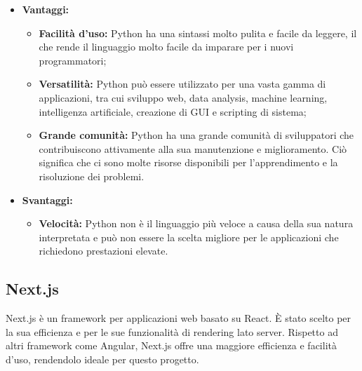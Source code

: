 \documentclass[10pt, a4paper]{article}
\begin{document}
\begin{itemize}
\item \textbf{Vantaggi:}
\begin{itemize}
\item \textbf{Facilità d'uso:} Python ha una sintassi molto pulita e facile da leggere, il che rende il linguaggio molto facile da imparare per i nuovi programmatori;
\item \textbf{Versatilità:} Python può essere utilizzato per una vasta gamma di applicazioni, tra cui sviluppo web, data analysis, machine learning, intelligenza artificiale, creazione di GUI e scripting di sistema;
\item \textbf{Grande comunità:} Python ha una grande comunità di sviluppatori che contribuiscono attivamente alla sua manutenzione e miglioramento. Ciò significa che ci sono molte risorse disponibili per l'apprendimento e la risoluzione dei problemi.
\end{itemize}
\item \textbf{Svantaggi:}
\begin{itemize}
\item \textbf{Velocità:} Python non è il linguaggio più veloce a causa della sua natura interpretata e può non essere la scelta migliore per le applicazioni che richiedono prestazioni elevate.
\end{itemize}
\end{itemize}

\subsection{Next.js}
Next.js è un framework per applicazioni web basato su React. È stato scelto per la sua efficienza e per le sue funzionalità di rendering lato server. Rispetto ad altri framework come Angular, Next.js offre una maggiore efficienza e facilità d'uso, rendendolo ideale per questo progetto.
\end{document}
